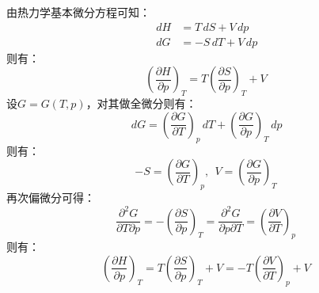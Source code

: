 \documentclass[a4paper,12pt]{article}
\begin{document}
\section{}
由热力学基本微分方程可知：
\begin{equation}\nonumber
\begin{aligned}
	\,dH&=T\,dS+V\,dp\\
	\,dG&=-S\,dT+V\,dp
\end{aligned}
\end{equation}
则有：
\begin{equation}\nonumber
	\left(\frac{\partial H}{\partial p}\right)_T=T\left(\frac{\partial S}{\partial p}\right)_T+V
\end{equation}
设$G=G(T,p)$，对其做全微分则有：
\begin{equation}\nonumber
	\,dG=\left(\frac{\partial G}{\partial T}\right)_{p}\,dT+\left(\frac{\partial G}{\partial p}\right)_{T}\,dp
\end{equation}
则有：
\begin{equation}\nonumber
	-S=\left(\frac{\partial G}{\partial T}\right)_{p},~~V=\left(\frac{\partial G}{\partial p}\right)_{T}
\end{equation}
再次偏微分可得：
\begin{equation}\nonumber
	\frac{\partial^2G}{\partial T\partial p}=-\left(\frac{\partial S}{\partial p}\right)_{T}=\frac{\partial^2G}{\partial p\partial T}=\left(\frac{\partial V}{\partial T}\right)_p
\end{equation}
则有：
\begin{equation}\nonumber
	\left(\frac{\partial H}{\partial p}\right)_T=T\left(\frac{\partial S}{\partial p}\right)_T+V=-T\left(\frac{\partial V}{\partial T}\right)_p+V
\end{equation}
\end{document}
